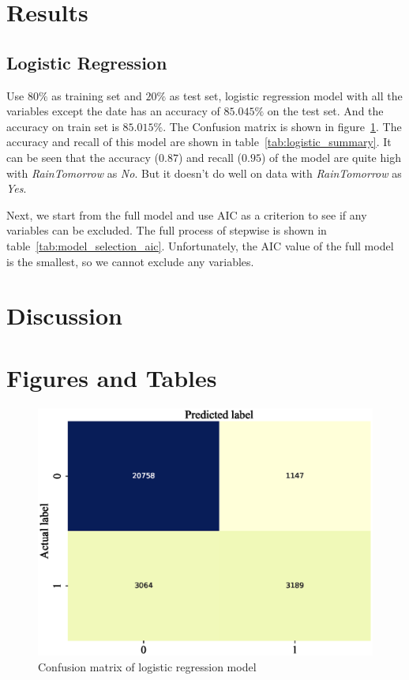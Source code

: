 \documentclass[11pt, a4paper, jou]{apa7}
\begin{document}
\section{Results}

\subsection{Logistic Regression}
    Use $80\%$ as training set and $20\%$ as test set, logistic regression model with all the variables except the date has an accuracy of $85.045\%$ on the test set. And the accuracy on train set is $85.015\%$. The Confusion matrix is shown in figure~\ref{fig:logistic_confusion}. The accuracy and recall of this model are shown in table~\ref{tab:logistic_summary}. It can be seen that the accuracy ($0.87$) and recall ($0.95$) of the model are quite high with \emph{RainTomorrow} as \emph{No}. But it doesn't do well on data with \emph{RainTomorrow} as \emph{Yes}. 

    Next, we start from the full model and use AIC as a criterion to see if any variables can be excluded. The full process of stepwise is shown in table~\ref{tab:model_selection_aic}. Unfortunately, the AIC value of the full model is the smallest, so we cannot exclude any variables. 

    
    


\section{Discussion}

    

\printbibliography 
\clearpage
\appendix
\section{Figures and Tables}
\begin{figure}[p]
    \centering
    \caption{Confusion matrix of logistic regression model}\label{fig:logistic_confusion}
    \includegraphics[width=.45\textwidth]{figures/Logit_confusion_matrix.eps}
\end{figure}
\end{document}
